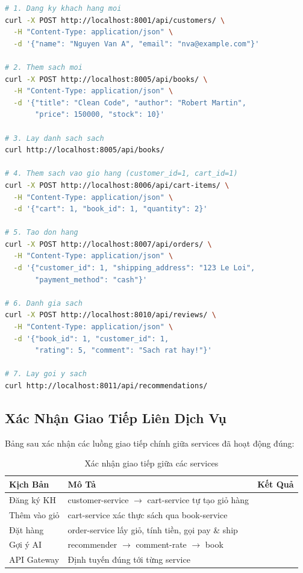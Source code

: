 \documentclass[12pt,a4paper]{article}
\begin{document}
\begin{lstlisting}[language=bash, caption={Test API -- Tạo và lấy dữ liệu}]
# 1. Dang ky khach hang moi
curl -X POST http://localhost:8001/api/customers/ \
  -H "Content-Type: application/json" \
  -d '{"name": "Nguyen Van A", "email": "nva@example.com"}'

# 2. Them sach moi
curl -X POST http://localhost:8005/api/books/ \
  -H "Content-Type: application/json" \
  -d '{"title": "Clean Code", "author": "Robert Martin",
       "price": 150000, "stock": 10}'

# 3. Lay danh sach sach
curl http://localhost:8005/api/books/

# 4. Them sach vao gio hang (customer_id=1, cart_id=1)
curl -X POST http://localhost:8006/api/cart-items/ \
  -H "Content-Type: application/json" \
  -d '{"cart": 1, "book_id": 1, "quantity": 2}'

# 5. Tao don hang
curl -X POST http://localhost:8007/api/orders/ \
  -H "Content-Type: application/json" \
  -d '{"customer_id": 1, "shipping_address": "123 Le Loi",
       "payment_method": "cash"}'

# 6. Danh gia sach
curl -X POST http://localhost:8010/api/reviews/ \
  -H "Content-Type: application/json" \
  -d '{"book_id": 1, "customer_id": 1,
       "rating": 5, "comment": "Sach rat hay!"}'

# 7. Lay goi y sach
curl http://localhost:8011/api/recommendations/
\end{lstlisting}

\subsection{Xác Nhận Giao Tiếp Liên Dịch Vụ}

Bảng sau xác nhận các luồng giao tiếp chính giữa services đã hoạt động đúng:

\begin{table}[H]
  \centering
  \caption{Xác nhận giao tiếp giữa các services}
  \begin{tabularx}{\textwidth}{lXl}
    \toprule
    \textbf{Kịch Bản} & \textbf{Mô Tả} & \textbf{Kết Quả} \\
    \midrule
    Đăng ký KH & customer-service $\to$ cart-service tự tạo giỏ hàng & \textcolor{successgreen}{\checkmark} \\
    Thêm vào giỏ & cart-service xác thực sách qua book-service & \textcolor{successgreen}{\checkmark} \\
    Đặt hàng & order-service lấy giỏ, tính tiền, gọi pay \& ship & \textcolor{successgreen}{\checkmark} \\
    Gợi ý AI & recommender $\to$ comment-rate $\to$ book & \textcolor{successgreen}{\checkmark} \\
    API Gateway & Định tuyến đúng tới từng service & \textcolor{successgreen}{\checkmark} \\
    \bottomrule
  \end{tabularx}
\end{table}
\end{document}

